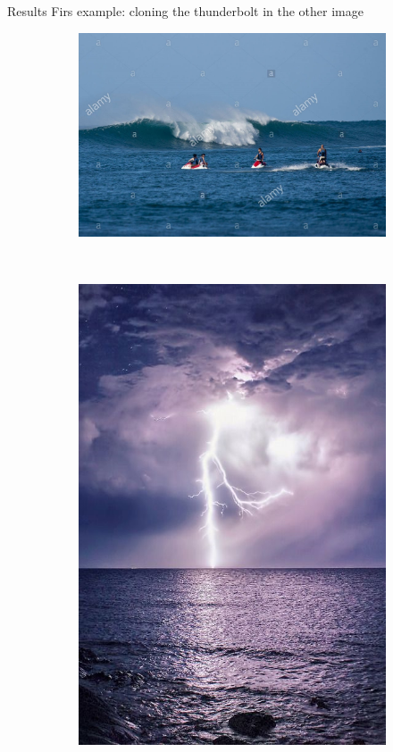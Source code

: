 \documentclass[11pt]{beamer}
\begin{document}
\begin{frame}{Results}
Firs example: cloning the thunderbolt in the other image
\begin{figure}
    \centering
    \begin{subfigure}[b]{0.5\textwidth}
        \includegraphics[width=\textwidth]{Mar_motos}

    \end{subfigure}
    ~ 
        \begin{subfigure}[b]{0.3\textwidth}
        \includegraphics[width=\textwidth]{Thunderbolt}


\end{subfigure}
\end{figure}
\end{frame}
\end{document}
